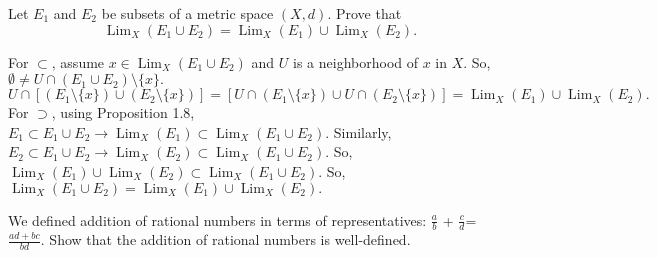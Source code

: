 \documentclass[12pt,letterpaper,boxed]{hmcpset}
\DeclareMathOperator{\Lim}{Lim}
\begin{document}

\begin{problem}[Exercise 1.9]
Let $E_1$ and $E_2$ be subsets of a metric space $(X,d).$ Prove that $$\Lim_X(E_1 \cup E_2) = \Lim_X(E_1)\cup\Lim_X(E_2).$$
\end{problem}

\begin{solution}
For $\subset$, assume $x\in \Lim_X(E_1\cup E_2)$ and $U$ is a neighborhood of $x$ in $X$. So, $\emptyset\neq U \cap (E_1 \cup E_2)\setminus \{x\}.$ $U \cap [(E_1\setminus\{x\})\cup(E_2\setminus\{x\})] = [U\cap(E_1\setminus\{x\})\cup U \cap (E_2\setminus\{x\})] = \Lim_X(E_1)\cup\Lim_X(E_2).$ For $\supset$, using Proposition 1.8, $E_1\subset E_1 \cup E_2 \rightarrow \Lim_X(E_1)\subset\Lim_X(E_1\cup E_2).$ Similarly, $E_2\subset E_1 \cup E_2 \rightarrow \Lim_X(E_2)\subset\Lim_X(E_1\cup E_2).$ So, $\Lim_X(E_1) \cup \Lim_X(E_2) \subset \Lim_X(E_1\cup E_2).$ So, $\Lim_X(E_1 \cup E_2) = \Lim_X(E_1)\cup\Lim_X(E_2).$
\end{solution}

\begin{problem}
We defined addition of rational numbers in terms of representatives: \(\frac{a}{b}\) + \(\frac{c}{d}\)= \(\frac{ad+bc}{bd}\). Show that the addition of rational numbers is well-defined.
\end{problem}

\begin{solution}

\end{solution}
\end{document}
